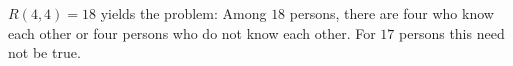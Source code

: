 $R(4, 4) = 18$ yields the problem: Among $18$ persons, there are four who know each other or four persons who do not know each other. For $17$ persons this need not be true.
